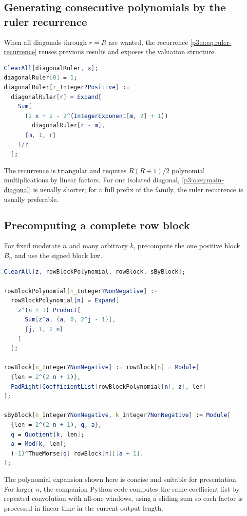 \documentclass[11pt,oneside]{article}
\numberwithin{equation}{section}
\theoremstyle{definition}
\theoremstyle{remark}
\begin{document}
\subsection{Generating consecutive polynomials by the ruler recurrence}

When all diagonals through \(r=R\) are wanted, the recurrence
\eqref{p3:a:eq:ruler-recurrence} reuses previous results and exposes the valuation
structure.

\begin{lstlisting}[language=Mathematica,basicstyle=\ttfamily\footnotesize,caption={Ruler-function recurrence for consecutive diagonals.}]
ClearAll[diagonalRuler, x];
diagonalRuler[0] = 1;
diagonalRuler[r_Integer?Positive] :=
  diagonalRuler[r] = Expand[
    Sum[
      (2 x + 2 - 2^(IntegerExponent[m, 2] + 1))
        diagonalRuler[r - m],
      {m, 1, r}
    ]/r
  ];
\end{lstlisting}

The recurrence is triangular and requires \(R(R+1)/2\) polynomial
multiplications by linear factors.  For one isolated diagonal,
\eqref{p3:a:eq:main-diagonal} is usually shorter; for a full prefix of the family,
the ruler recurrence is usually preferable.

\subsection{Precomputing a complete row block}

For fixed moderate \(n\) and many arbitrary \(k\), precompute the one positive
block \(B_n\) and use the signed block law.

\begin{lstlisting}[language=Mathematica,caption={Block-based exact table lookup.}]
ClearAll[z, rowBlockPolynomial, rowBlock, sByBlock];

rowBlockPolynomial[n_Integer?NonNegative] :=
  rowBlockPolynomial[n] = Expand[
    z^(n + 1) Product[
      Sum[z^a, {a, 0, 2^j - 1}],
      {j, 1, 2 n}
    ]
  ];

rowBlock[n_Integer?NonNegative] := rowBlock[n] = Module[
  {len = 2^(2 n + 1)},
  PadRight[CoefficientList[rowBlockPolynomial[n], z], len]
];

sByBlock[n_Integer?NonNegative, k_Integer?NonNegative] := Module[
  {len = 2^(2 n + 1), q, a},
  q = Quotient[k, len];
  a = Mod[k, len];
  (-1)^ThueMorse[q] rowBlock[n][[a + 1]]
];
\end{lstlisting}

The polynomial expansion shown here is concise and suitable for presentation.
For larger \(n\), the companion Python code computes the same coefficient list
by repeated convolution with all-one windows, using a sliding sum so each
factor is processed in linear time in the current output length.
\end{document}
